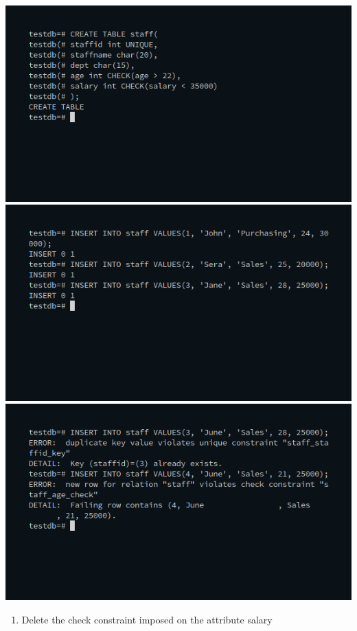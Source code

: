 \begin{enumerate}
\begin{enumerate}
\begin{verbatim}
\end{verbatim}
\newline
\includegraphics[width=\linewidth]{../Images/Constraints/3.png}\newline
\includegraphics[width=\linewidth]{../Images/Constraints/4.png}\newline
\includegraphics[width=\linewidth]{../Images/Constraints/5.png}\newline
\begin{enumerate}
\item Delete the check constraint imposed on the attribute salary\newline
\begin{verbatim}


\end{verbatim}
\end{enumerate}
\end{enumerate}
\end{enumerate}
